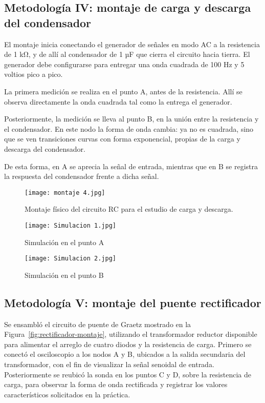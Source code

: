 \documentclass[conference]{IEEEtran} %
\begin{document}
\subsection{Metodología IV: montaje de carga y descarga del condensador}
El montaje inicia conectando el generador de señales en modo AC a la resistencia de 1 kΩ, y de allí al condensador de 1 µF que cierra el circuito hacia tierra. El generador debe configurarse para entregar una onda cuadrada de 100 Hz y 5 voltios pico a pico.

La primera medición se realiza en el punto A, antes de la resistencia. Allí se observa directamente la onda cuadrada tal como la entrega el generador.

Posteriormente, la medición se lleva al punto B, en la unión entre la resistencia y el condensador. En este nodo la forma de onda cambia: ya no es cuadrada, sino que se ven transiciones curvas con forma exponencial, propias de la carga y descarga del condensador.

De esta forma, en A se aprecia la señal de entrada, mientras que en B se registra la respuesta del condensador frente a dicha señal.

\begin{figure}[htbp]
    \centering
\texttt{[image: montaje 4.jpg]}
    \caption{Montaje físico del circuito RC para el estudio de carga y descarga.}
    \label{fig:montaje 4}
\end{figure}
\begin{figure}[htbp]
    \centering
\texttt{[image: Simulacion 1.jpg]}
    \caption{Simulación en el punto A}
    \label{fig:simulacion-rc-esquematico}
\end{figure}
\begin{figure}[htbp]
    \centering
\texttt{[image: Simulacion 2.jpg]}
    \caption{Simulación en el punto B}
    \label{fig:simulacion-rc-respuesta}
\end{figure}

\subsection{Metodología V: montaje del puente rectificador}
Se ensambló el circuito de puente de Graetz mostrado en la Figura~\ref{fig:rectificador-montaje}, utilizando el transformador reductor disponible para alimentar el arreglo de cuatro diodos y la resistencia de carga. Primero se conectó el osciloscopio a los nodos A y B, ubicados a la salida secundaria del transformador, con el fin de visualizar la señal senoidal de entrada. Posteriormente se reubicó la sonda en los puntos C y D, sobre la resistencia de carga, para observar la forma de onda rectificada y registrar los valores característicos solicitados en la práctica.
\end{document}

